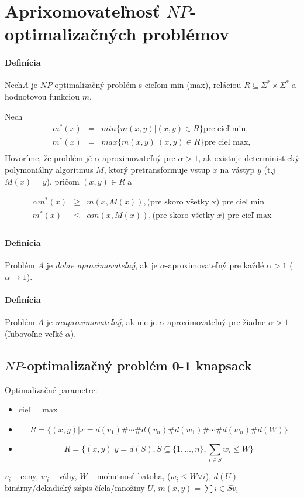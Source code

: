\documentclass{article}
\begin{document}
\section{Aprixomovateľnosť $NP$-optimalizačných problémov}
\paragraph{Definícia} Nech$A$ je $NP$-optimalizačný problém s cieľom min (max),
reláciou $R \subseteq \Sigma^*\times \Sigma^*$ a hodnotovou funkciou $m$. 
\par
Nech 
$$
\begin{array}{lll}
m^*(x) &=& min \{ m(x,y) | (x,y) \in R\} \mbox{pre cieľ min},  \\
m^*(x) &=& max \{ m(x,y) \ (x,y) \in R\} \mbox{pre cieľ max},  \\
\end{array}
$$
Hovoríme, že problém jč $\alpha$-aproximovateľný pre $\alpha>1$, ak existuje
deterministický polymoniálny algoritmus $M$, ktorý pretransformuje vstup $x$ na
vástyp $y$ (t.j $M(x)=y$), pričom $(x,y)\in R$ a 

$$
\begin{array}{lll}
\alpha m^*(x) &\geq& m(x, M(x)), \mbox{(pre skoro všetky x) pre cieľ min} \\
m^*(x)        &\leq& \alpha m(x, M(x)), \mbox{(pre skoro všetky $x$) pre cieľ
max} \\
\end{array}
$$

\paragraph{Definícia} Problém $A$ je \emph{dobre aproximovateľný}, ak je
$\alpha$-aproximovateľný pre každé $\alpha>1$ ($\alpha \rightarrow 1$).

\paragraph{Definícia} Problém $A$ je \emph{neaproximovateľný}, ak nie je
$\alpha$-aproximovateľný pre žiadne $\alpha>1$ (ľubovoľne veľké $\alpha$).

\subsection{$NP$-optimalizačný problém 0-1 knapsack}
\par Optimalizačné parametre: 
\begin{itemize}
	\item cieľ = max
	\item $$R=\{(x,y) | x=d(v_1)\#\cdots\#d(v_n)\#d(w_1)\#\cdots\#d(w_n)\#d(W)\}$$
	\item $$R=\{(x,y) | y=d(S), S \subseteq \{1,\ldots, n\}, \sum_{i\in S}
	w_i \leq W\}$$
\end{itemize}
$v_i$ -- ceny, $w_i$ -- váhy, $W$ -- mohutnosť batoha, ($w_i \leq W \forall i$),
$d(U)$ -- binárny/dekadický zápis čícla/množiny $U$, $m(x,y) = \sum{i\in S} v_i$
\end{document}
